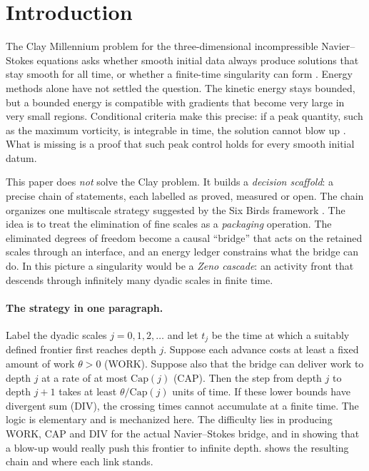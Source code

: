 \section{Introduction}\label{sec:intro}

The Clay Millennium problem for the three-dimensional incompressible Navier--Stokes equations asks
whether smooth initial data always produce solutions that stay smooth for all time, or whether a
finite-time singularity can form \citep{fefferman2006clay}. Energy methods alone have not settled
the question. The kinetic energy stays bounded, but a bounded energy is compatible with gradients
that become very large in very small regions. Conditional criteria make this precise: if a peak
quantity, such as the maximum vorticity, is integrable in time, the solution cannot blow up
\citep{bkm_1984,serrin1962interior}. What is missing is a proof that such peak control holds for
every smooth initial datum.

This paper does \emph{not} solve the Clay problem. It builds a \emph{decision scaffold}: a precise
chain of statements, each labelled as proved, measured or open. The chain organizes one
multiscale strategy suggested by the Six Birds framework \citep{tsiokos_2026_18365949}. The idea
is to treat the elimination of fine scales as a \emph{packaging} operation. The eliminated degrees
of freedom become a causal ``bridge'' that acts on the retained scales through an interface, and
an energy ledger constrains what the bridge can do. In this picture a singularity would be a
\emph{Zeno cascade}: an activity front that descends through infinitely many dyadic scales in
finite time.

\paragraph{The strategy in one paragraph.}
Label the dyadic scales $j=0,1,2,\dots$ and let $t_j$ be the time at which a suitably defined
frontier first reaches depth $j$. Suppose each advance costs at least a fixed amount of work
$\theta>0$ (WORK). Suppose also that the bridge can deliver work to depth $j$ at a rate of at most
$\mathrm{Cap}(j)$ (CAP). Then the step from depth $j$ to depth $j+1$ takes at least
$\theta/\mathrm{Cap}(j)$ units of time. If these lower bounds have divergent sum (DIV), the crossing
times cannot accumulate at a finite time. The logic is elementary and is mechanized here. The
difficulty lies in producing WORK, CAP and DIV for the actual Navier--Stokes bridge, and in
showing that a blow-up would really push this frontier to infinite depth.
 shows the resulting chain and where each link stands.

